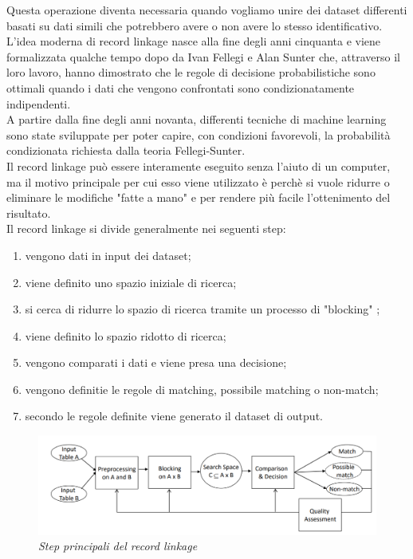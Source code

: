 \documentclass[a4paper,12pt]{article}
\begin{document}
\noindent Questa operazione diventa necessaria quando vogliamo unire dei dataset differenti basati su dati simili che potrebbero avere o non avere lo stesso identificativo. \\

\noindent L'idea moderna di record linkage nasce alla fine degli anni cinquanta e viene formalizzata qualche tempo dopo da Ivan Fellegi e Alan Sunter \cite{fellegi69} che, attraverso il loro lavoro, hanno dimostrato che le regole di decisione probabilistiche sono ottimali quando i dati che vengono confrontati sono condizionatamente indipendenti. \\

\noindent A partire dalla fine degli anni novanta, differenti tecniche di machine learning sono state sviluppate per poter capire, con condizioni favorevoli, la probabilità condizionata richiesta dalla teoria Fellegi-Sunter. \\

\noindent Il record linkage può essere interamente eseguito senza l'aiuto di un computer, ma il motivo principale per cui esso viene utilizzato è perchè si vuole ridurre o eliminare le modifiche "fatte a mano" e per rendere più facile l'ottenimento del risultato. \\

\noindent Il record linkage si divide generalmente nei seguenti step:
\begin{enumerate}
\item vengono dati in input dei dataset;
\item viene definito uno spazio iniziale di ricerca;
\item si cerca di ridurre lo spazio di ricerca tramite un processo di "blocking" ;
\item viene definito lo spazio ridotto di ricerca;
\item vengono comparati i dati e viene presa una decisione;
\item vengono definitie le regole di matching, possibile matching o non-match;
\item secondo le regole definite viene generato il dataset di output.
\end{enumerate}

\begin{figure}[H]
	\centering
	\includegraphics[width=0.8\linewidth]{img/recordlinkage.png}
	\caption{\textit{Step principali del record linkage}}
\end{figure}
\end{document}
